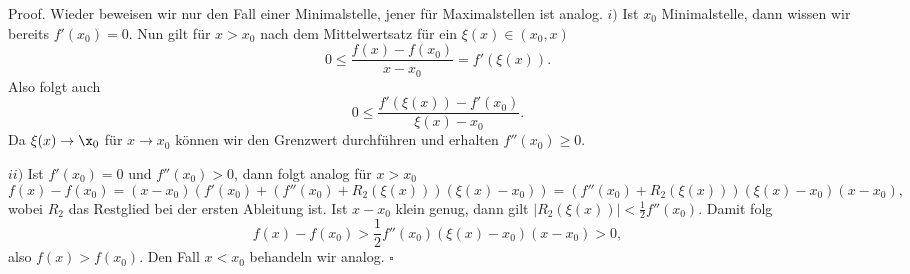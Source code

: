 \documentclass[letterpaper,10pt,english]{jupyterBook}
\begin{document}
\begin{emphBox}{}{}
Proof. Wieder beweisen wir nur den Fall einer Minimalstelle, jener für Maximalstellen ist analog.
\(i)\) Ist \(x_0\) Minimalstelle, dann wissen wir bereits \(f'(x_0) = 0\). Nun gilt für \(x > x_0\) nach dem Mittelwertsatz für ein \(\xi(x) \in (x_0,x)\)
\begin{equation*}
 0 \leq  \frac{f(x)-f(x_0)}{x-x_0} = f'(\xi(x)).
\end{equation*}
Also folgt auch
\begin{equation*}
 0 \leq \frac{f'(\xi(x)) - f'(x_0)}{\xi(x)-x_0}.
\end{equation*}
Da \(\xi(x) \rightarrow \x_0\) für \(x \rightarrow x_0\) können wir den Grenzwert durchführen und erhalten \(f''(x_0) \geq 0\).

\(ii)\) Ist \(f'(x_0) = 0\) und \(f''(x_0) > 0\), dann folgt analog für \(x > x_0\)
\begin{equation*}
 f(x) - f(x_0) = (x-x_0) ( f'(x_0) + (f''(x_0) + R_2(\xi(x)))(\xi(x)-x_0)) = (f''(x_0) + R_2(\xi(x)))(\xi(x)-x_0)(x-x_0),
\end{equation*}
wobei \(R_2\) das Restglied bei der ersten Ableitung ist. Ist \(x-x_0\) klein genug, dann gilt
\(|R_2(\xi(x))| < \frac{1}2 f''(x_0)\). Damit folg
\begin{equation*}
 f(x) - f(x_0) > \frac{1}2 f''(x_0) (\xi(x)-x_0)(x-x_0) > 0,
\end{equation*}
also \(f(x) > f(x_0)\). Den Fall \(x < x_0\) behandeln wir analog. \(\square\)
\end{emphBox}
\end{document}

